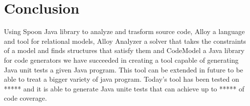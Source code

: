 \chapter*{Conclusion}
\label{ch:Conclusion}
	\thispagestyle{conclusion}
	 Using Spoon Java library to analyze and trasform source code, Alloy a language and tool for relational models, Alloy Analyzer a solver that takes the constraints of a model and finds structures that satisfy them and CodeModel a Java library for code generators we have succeeded in creating a tool capable of generating Java unit tests a given Java program. This tool can be extended in future to be able to treat a bigger variety of java program. Today's tool has been tested on ***** and it is able to generate Java unite tests that can achieve up to ***** of code coverage.